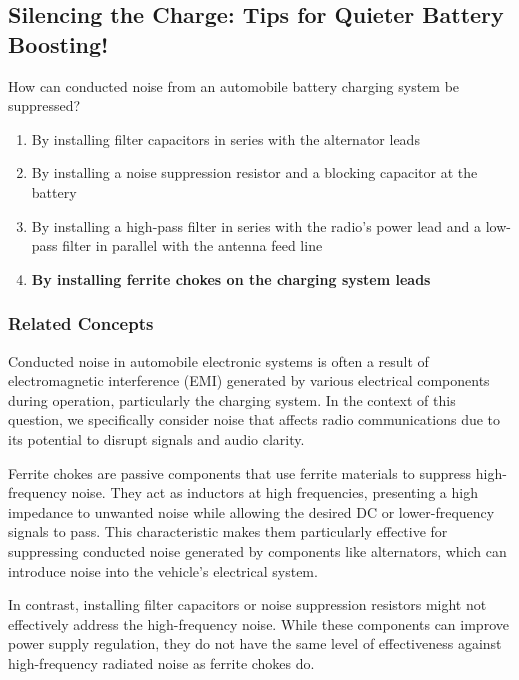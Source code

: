 \subsection{Silencing the Charge: Tips for Quieter Battery Boosting!}

\begin{tcolorbox}[colback=gray!10, colframe=black, title=E4E04] How can conducted noise from an automobile battery charging system be suppressed?  
\begin{enumerate}[label=\Alph*.]
    \item By installing filter capacitors in series with the alternator leads
    \item By installing a noise suppression resistor and a blocking capacitor at the battery
    \item By installing a high-pass filter in series with the radio’s power lead and a low-pass filter in parallel with the antenna feed line
    \item \textbf{By installing ferrite chokes on the charging system leads}
\end{enumerate} \end{tcolorbox}

\subsubsection{Related Concepts}

Conducted noise in automobile electronic systems is often a result of electromagnetic interference (EMI) generated by various electrical components during operation, particularly the charging system. In the context of this question, we specifically consider noise that affects radio communications due to its potential to disrupt signals and audio clarity.

Ferrite chokes are passive components that use ferrite materials to suppress high-frequency noise. They act as inductors at high frequencies, presenting a high impedance to unwanted noise while allowing the desired DC or lower-frequency signals to pass. This characteristic makes them particularly effective for suppressing conducted noise generated by components like alternators, which can introduce noise into the vehicle's electrical system.

In contrast, installing filter capacitors or noise suppression resistors might not effectively address the high-frequency noise. While these components can improve power supply regulation, they do not have the same level of effectiveness against high-frequency radiated noise as ferrite chokes do.

